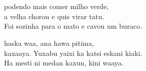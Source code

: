 \chapter*{}

\mbox{}\vspace*{\fill}



 podendo mais comer milho verde,\\
a velha chorou e quis virar tatu.\\
Foi sozinha para o mato e cavou um buraco.

\vspace{2em}

 haska waa, ana hawa pitima,\\
kaxaaya. Yuxabu yaixi ka katsi eskani kiaki.\\
Ha mesti ni medan kaxun, kini waaya.

\vspace*{\fill}


